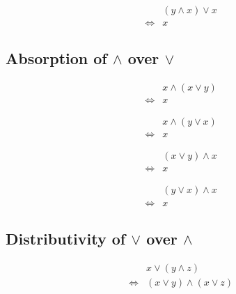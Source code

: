\begin{prop}
\label{Proposition:lor_land_absorption_4}
\begin{align*}
& (y \land x) \lor x \\
\iff & x
\end{align*}
\end{prop}

\subsection{Absorption of $\land$ over $\lor$}
\begin{prop}
\label{Proposition:land_lor_absorption_1}
\begin{align*}
& x \land (x \lor y) \\
\iff & x
\end{align*}
\end{prop}

\begin{prop}
\label{Proposition:land_lor_absorption_2}
\begin{align*}
& x \land (y \lor x) \\
\iff & x
\end{align*}
\end{prop}

\begin{prop}
\label{Proposition:land_lor_absorption_3}
\begin{align*}
& (x \lor y) \land x \\
\iff & x
\end{align*}
\end{prop}

\begin{prop}
\label{Proposition:land_lor_absorption_4}
\begin{align*}
& (y \lor x) \land x \\
\iff & x
\end{align*}
\end{prop}

\subsection{Distributivity of $\lor$ over $\land$}
\begin{prop}
\label{Proposition:lor_land_distributivity_1}
\begin{align*}
& x \lor (y \land z) \\
\iff & (x \lor y) \land (x \lor z)
\end{align*}
\end{prop}

